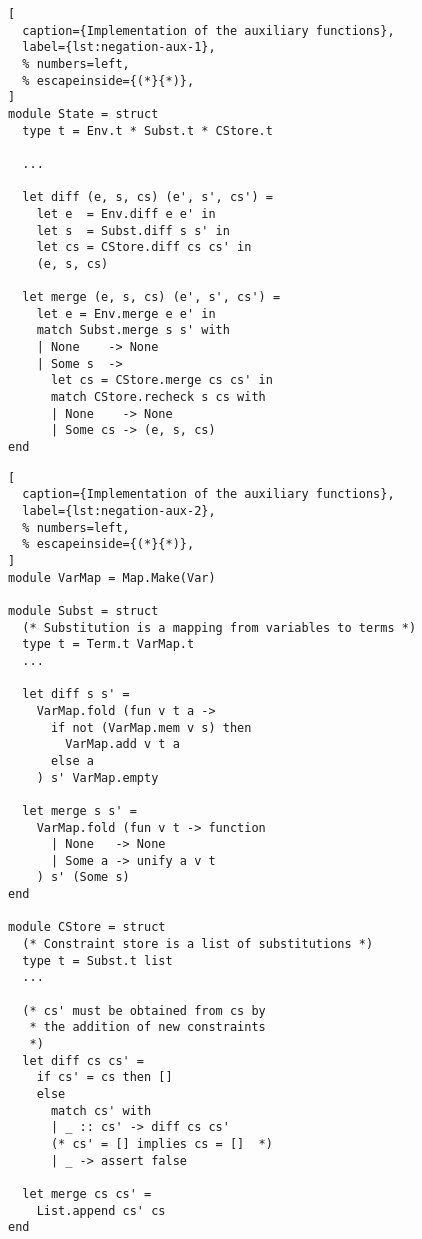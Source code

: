 \begin{minipage}[t]{0.47\textwidth}
\begin{lstlisting}[
  caption={Implementation of the auxiliary functions},
  label={lst:negation-aux-1},
  % numbers=left,
  % escapeinside={(*}{*)},
]
module State = struct
  type t = Env.t * Subst.t * CStore.t

  ...

  let diff (e, s, cs) (e', s', cs') = 
    let e  = Env.diff e e' in
    let s  = Subst.diff s s' in
    let cs = CStore.diff cs cs' in
    (e, s, cs)

  let merge (e, s, cs) (e', s', cs') = 
    let e = Env.merge e e' in
    match Subst.merge s s' with
    | None    -> None
    | Some s  ->
      let cs = CStore.merge cs cs' in
      match CStore.recheck s cs with
      | None    -> None
      | Some cs -> (e, s, cs) 
end
\end{lstlisting}
\end{minipage}\hfill
\begin{minipage}[t]{0.47\textwidth}
\begin{lstlisting}[
  caption={Implementation of the auxiliary functions},
  label={lst:negation-aux-2},
  % numbers=left,
  % escapeinside={(*}{*)},
]
module VarMap = Map.Make(Var)

module Subst = struct
  (* Substitution is a mapping from variables to terms *)
  type t = Term.t VarMap.t
  ...

  let diff s s' = 
    VarMap.fold (fun v t a -> 
      if not (VarMap.mem v s) then 
        VarMap.add v t a
      else a
    ) s' VarMap.empty

  let merge s s' = 
    VarMap.fold (fun v t -> function
      | None   -> None
      | Some a -> unify a v t
    ) s' (Some s)
end

module CStore = struct
  (* Constraint store is a list of substitutions *)
  type t = Subst.t list
  ... 

  (* cs' must be obtained from cs by 
   * the addition of new constraints  
   *)
  let diff cs cs' = 
    if cs' = cs then []
    else
      match cs' with 
      | _ :: cs' -> diff cs cs'
      (* cs' = [] implies cs = []  *)
      | _ -> assert false

  let merge cs cs' = 
    List.append cs' cs
end
\end{lstlisting}
\end{minipage}


